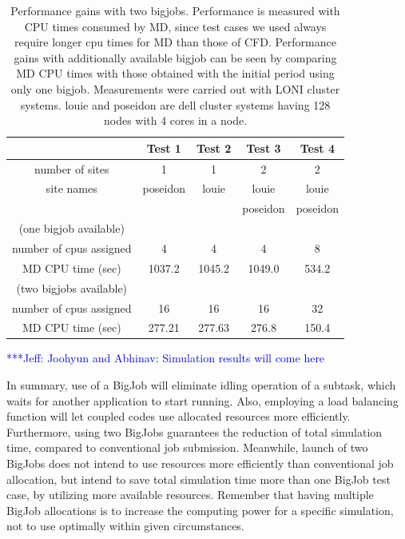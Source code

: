 \documentclass[conference,final]{IEEEtran}
\newcommand{\skonote}[1]{ {\textcolor{blue} { ***Jeff: #1 }}}
\newcommand{\skonote}[1]{}
\begin{document}
\begin{table}[!h]
\begin{center}
  \caption{\small Performance gains with two bigjobs. Performance is measured with CPU times consumed by MD, since test cases we used always require longer cpu times for MD than those of CFD.  Performance gains with additionally available bigjob can be seen by comparing MD CPU times with those obtained with the initial period using only one bigjob.  Measurements were carried out with LONI cluster systems.  louie and poseidon are dell cluster systems having 128 nodes with 4 cores in a node. \newline }
\label{table:TwoBigJobs}
\begin{tabular}{ c| c c c c }
\hline
 & Test 1   & Test 2 & Test 3   & Test 4 \\
\hline
number of sites & 1 & 1 & 2 & 2  \\
site names & poseidon & louie & louie& louie \\
& & & poseidon  & poseidon \\
\hline
(one bigjob available) & & & & \\
number of cpus assigned & 4 & 4 & 4 & 8 \\
MD CPU time  (sec) & 1037.2 & 1045.2 & 1049.0 & 534.2  \\
\hline
(two bigjobs available) & & & & \\
number of cpus assigned & 16 & 16 & 16 & 32 \\

MD CPU time  (sec) & 277.21 & 277.63  & 276.8 & 150.4  \\

\hline
\end{tabular}
\end{center}
\end{table}



\skonote{Joohyun and Abhinav: Simulation results will come here}

In summary, use of a BigJob will eliminate idling operation of a subtask, which waits for another application to start running. Also, employing a load balancing function will let coupled codes use allocated resources more efficiently. Furthermore, using two BigJobs guarantees the reduction of total simulation time, compared to conventional job submission. Meanwhile, launch of two BigJobs does not intend to use resources more efficiently than conventional job allocation, but intend to save total simulation time more than one BigJob test case, by utilizing more available resources. Remember that having multiple BigJob allocations is to increase the computing power for a specific simulation, not to use optimally within given circumstances.
\end{document}
